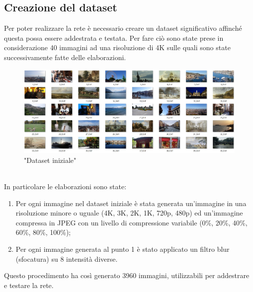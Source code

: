 \documentclass[a4paper,11pt]{article}
\begin{document}
    \subsection{Creazione del dataset}
    Per poter realizzare la rete è necessario creare un dataset significativo affinché questa possa essere addestrata e testata. 
    Per fare ciò sono state prese in considerazione 40 immagini ad una risoluzione di 4K sulle quali sono state successivamente fatte delle elaborazioni.
    \begin{figure}[h]
        \centering
        \includegraphics[scale=0.365]{dataset}
        \caption{"Dataset iniziale"}
    \end{figure}
    \\In particolare le elaborazioni sono state:
    \begin{enumerate}
        \item Per ogni immagine nel dataset iniziale è stata generata un'immagine in una risoluzione minore o uguale (4K, 3K, 2K, 1K, 720p, 480p) ed un'immagine compressa in JPEG con un livello di compressione variabile (0\%, 20\%, 40\%, 60\%, 80\%, 100\%);
        \item Per ogni immagine generata al punto 1 è stato applicato un filtro blur (sfocatura) su 8 intensità diverse.
    \end{enumerate}
    Questo procedimento ha così generato 3960 immagini, utilizzabili per addestrare e testare la rete.
    
\end{document}
